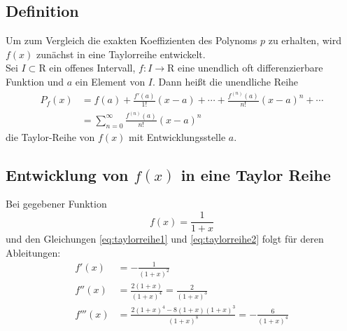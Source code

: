 \documentclass{beamer}
\begin{document}
  \subsection{Definition}
  \begin{frame}
    Um zum Vergleich die exakten Koeffizienten des Polynoms $p$ zu erhalten, wird $f(x)$ zunächst in eine Taylorreihe entwickelt. 
    \\[1em]
    Sei \( I \subset \mathrm{R} \) ein offenes Intervall, \( f \colon I \rightarrow \mathrm{R} \) eine
    unendlich oft differenzierbare Funktion und \(a\) ein Element von \(I\). Dann heißt die unendliche
    Reihe
    \begin{align}
            \label{eq:taylorreihe1}
    P_f(x)  & = f(a) + \frac{f'(a)}{1!} (x-a) + \dotsb +
                \frac{f^{(n)}(a)}{n!} (x-a)^n + \dotsb\\
            \label{eq:taylorreihe2}
            & = \sum_{n=0}^\infty \frac{f^{(n)}(a)}{n!} (x-a)^n
    \end{align}
    die Taylor-Reihe von $f(x)$ mit Entwicklungsstelle $a$.
  \end{frame}

  \subsection{Entwicklung von $f(x)$ in eine Taylor Reihe}
  \begin{frame}
    Bei gegebener Funktion
    \begin{equation*}
        f\left(x\right) = \frac{1}{1+x}
    \end{equation*}
    und den Gleichungen \ref{eq:taylorreihe1} und \ref{eq:taylorreihe2} folgt für deren Ableitungen:
    \begin{align}
        f'\left(x\right)    &= -\frac{1}{\left(1+x\right)^2} \\
        f''\left(x\right)   &=  \frac{2\left(1+x\right)}{\left(1+x\right)^4}
                            =  \frac{2}{\left(1+x\right)^3} \\
        f'''\left(x\right)  &=  \frac{2\left(1+x\right)^4 -8\left(1+x\right)\left(1+x\right)^3}
                                {\left(1+x\right)^8}
                            =  -\frac{6}{\left(1+x\right)^4}
    \end{align}
  \end{frame}
  
\end{document}
